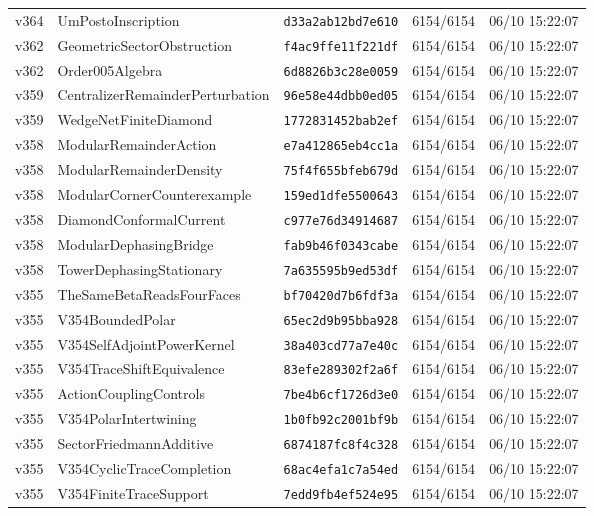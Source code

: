 \documentclass[11pt]{article}
\theoremstyle{definition}\newtheorem{deriv}{Derivação}
\begin{document}
{\begin{longtable}{@{}lllll@{}}
v364 & UmPostoInscription & \texttt{d33a2ab12bd7e610} & 6154/6154 & 06/10 15:22:07 \\
v362 & GeometricSectorObstruction & \texttt{f4ac9ffe11f221df} & 6154/6154 & 06/10 15:22:07 \\
v362 & Order005Algebra & \texttt{6d8826b3c28e0059} & 6154/6154 & 06/10 15:22:07 \\
v359 & CentralizerRemainderPerturbation & \texttt{96e58e44dbb0ed05} & 6154/6154 & 06/10 15:22:07 \\
v359 & WedgeNetFiniteDiamond & \texttt{1772831452bab2ef} & 6154/6154 & 06/10 15:22:07 \\
v358 & ModularRemainderAction & \texttt{e7a412865eb4cc1a} & 6154/6154 & 06/10 15:22:07 \\
v358 & ModularRemainderDensity & \texttt{75f4f655bfeb679d} & 6154/6154 & 06/10 15:22:07 \\
v358 & ModularCornerCounterexample & \texttt{159ed1dfe5500643} & 6154/6154 & 06/10 15:22:07 \\
v358 & DiamondConformalCurrent & \texttt{c977e76d34914687} & 6154/6154 & 06/10 15:22:07 \\
v358 & ModularDephasingBridge & \texttt{fab9b46f0343cabe} & 6154/6154 & 06/10 15:22:07 \\
v358 & TowerDephasingStationary & \texttt{7a635595b9ed53df} & 6154/6154 & 06/10 15:22:07 \\
v355 & TheSameBetaReadsFourFaces & \texttt{bf70420d7b6fdf3a} & 6154/6154 & 06/10 15:22:07 \\
v355 & V354BoundedPolar & \texttt{65ec2d9b95bba928} & 6154/6154 & 06/10 15:22:07 \\
v355 & V354SelfAdjointPowerKernel & \texttt{38a403cd77a7e40c} & 6154/6154 & 06/10 15:22:07 \\
v355 & V354TraceShiftEquivalence & \texttt{83efe289302f2a6f} & 6154/6154 & 06/10 15:22:07 \\
v355 & ActionCouplingControls & \texttt{7be4b6cf1726d3e0} & 6154/6154 & 06/10 15:22:07 \\
v355 & V354PolarIntertwining & \texttt{1b0fb92c2001bf9b} & 6154/6154 & 06/10 15:22:07 \\
v355 & SectorFriedmannAdditive & \texttt{6874187fc8f4c328} & 6154/6154 & 06/10 15:22:07 \\
v355 & V354CyclicTraceCompletion & \texttt{68ac4efa1c7a54ed} & 6154/6154 & 06/10 15:22:07 \\
v355 & V354FiniteTraceSupport & \texttt{7edd9fb4ef524e95} & 6154/6154 & 06/10 15:22:07 \\

\end{longtable}}
\end{document}

